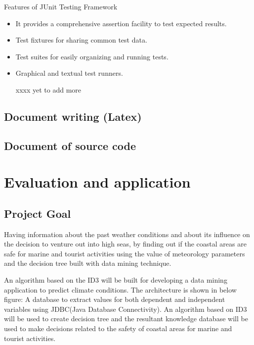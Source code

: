 \documentclass{article}
\begin{document}
Features of JUnit Testing Framework
\begin{itemize}

\item It provides a comprehensive assertion facility to test expected results.
\item Test fixtures for sharing common test data.
\item Test suites for easily organizing and running tests.
\item Graphical and textual test runners.

xxxx yet to add more 

\end{itemize}

\subsection{Document writing (Latex)}
\label{sec:latex}





\subsection{Document of source code}
\label{sec:documentsource}
\pagebreak

\section{Evaluation and application}
\label{sec:eval}

\subsection{Project Goal}
\label{sec:goal}

Having information about the past weather conditions and about its influence on the decision to venture out into high
seas, by finding out if the coastal areas are safe for marine and tourist activities using the value of meteorology parameters and the decision tree built with data mining technique.

An algorithm based on the ID3 will be built for developing a data mining application to predict climate conditions.
The architecture is shown in below figure: A database to extract values for both dependent and independent variables using JDBC(Java Database Connectivity).
An algorithm based on ID3 will be used to create decision tree and the resultant knowledge database will be used to make decisions related to the safety of coastal areas for marine and tourist activities.
\end{document}
